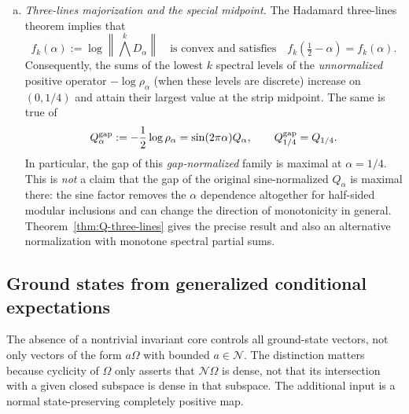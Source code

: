 \documentclass[a4paper,11pt]{article}
\theoremstyle{definition}
\newcommand{\mN}{\mathcal{N}}
\begin{document}
\begin{enumerate}[(a)]
\item \emph{Three-lines majorization and the special midpoint.}
The Hadamard three-lines theorem implies that
\begin{equation}
    f_k(\alpha):=\log\left\|\bigwedge^k D_\alpha\right\|
    \quad\text{is convex and satisfies}\quad
    f_k(\tfrac12-\alpha)=f_k(\alpha).
    \label{eq:Q-three-lines-convex}
\end{equation}
Consequently, the sums of the lowest $k$ spectral levels of the
\emph{unnormalized} positive operator $-\log\rho_\alpha$ (when these
levels are discrete) increase on $(0,1/4)$ and attain their largest
value at the strip midpoint. The same is true of
\begin{equation}
    Q_\alpha^{\rm gap}
    :=-\frac12\log\rho_\alpha
    =\sin(2\pi\alpha)Q_\alpha,
    \qquad Q_{1/4}^{\rm gap}=Q_{1/4}.
    \label{eq:Q-gap-normalization}
\end{equation}
In particular, the gap of this \emph{gap-normalized} family is maximal
at $\alpha=1/4$. This is \emph{not} a claim that the gap of the
original sine-normalized $Q_\alpha$ is maximal there: the sine factor
removes the $\alpha$ dependence altogether for half-sided modular
inclusions and can change the direction of monotonicity in general.
Theorem~\ref{thm:Q-three-lines} gives the precise result and also
an alternative normalization with monotone spectral partial sums.
\end{enumerate}

\subsection{Ground states from generalized conditional expectations}
\label{subsec:Q-ground-space}

The absence of a nontrivial invariant core controls all ground-state
vectors, not only vectors of the form $a\Omega$ with bounded $a\in\mN$.
The distinction matters because cyclicity of $\Omega$ only asserts that
$\mN\Omega$ is dense, not that its intersection with a given closed
subspace is dense in that subspace. The additional input is a normal
state-preserving completely positive map.
\end{document}
